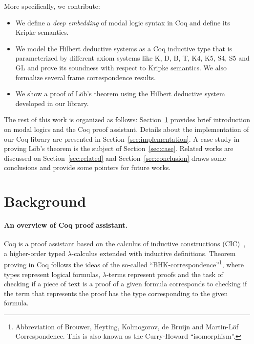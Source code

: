 \documentclass[sigconf,anonymous]{acmart}
\begin{document}

More specifically, we contribute:

\begin{itemize}
  \item We define a \emph{deep embedding} of modal logic syntax in Coq and
    define its Kripke semantics.
  \item We model the Hilbert deductive systems as a Coq inductive type that is
    parameterized by different axiom systems like K, D, B, T, K4, K5, S4, S5 and GL
    and prove its soundness with respect to Kripke semantics.
    We also formalize several frame correspondence results.
  \item We show a proof of L\"ob's theorem using the Hilbert deductive system
    developed in our library.
\end{itemize}

The rest of this work is organized as follows: Section~\ref{sec:background} provides
brief introduction on modal logics and the Coq proof assistant. Details about
the implementation of our Coq library are presented in
Section~\ref{sec:implementation}. A case study in proving L\"ob's theorem is
the subject of Section~\ref{sec:case}. Related works are discussed
on Section~\ref{sec:related} and Section~\ref{sec:conclusion} draws some conclusions and
provide some pointers for future works.

\section{Background}\label{sec:background}

\paragraph{An overview of Coq proof assistant.}

Coq is a proof assistant based on the calculus of inductive
constructions (CIC)~\cite{manual_cic}, a higher-order typed
$\lambda$-calculus extended with inductive definitions.  Theorem
proving in Coq follows the ideas of the so-called
``BHK-cor\-res\-pon\-dence''\footnote{Abbreviation of Brouwer, Heyting,
  Kolmogorov, de Bruijn and Martin-L\"of Correspondence. This is also
  known as the Curry-Howard ``isomorphism''.}, where types represent
logical formulas, $\lambda$-terms represent proofs
\cite{Bertot10} and the task of checking if a piece of text is a
proof of a given formula corresponds to checking if the term that
represents the proof has the type corresponding to the given formula.
\end{document}

